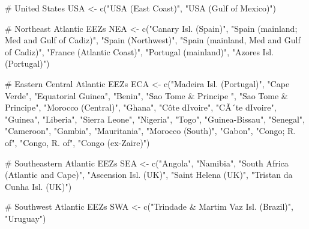 \documentclass[
  letterpaper,
  oneside,
  open=any]{scrbook}
\newenvironment{Shaded}{\begin{snugshade}}{\end{snugshade}}
\newcommand{\CommentTok}[1]{\textcolor[rgb]{0.37,0.37,0.37}{#1}}
\newcommand{\FunctionTok}[1]{\textcolor[rgb]{0.28,0.35,0.67}{#1}}
\newcommand{\NormalTok}[1]{\textcolor[rgb]{0.00,0.23,0.31}{#1}}
\newcommand{\OtherTok}[1]{\textcolor[rgb]{0.00,0.23,0.31}{#1}}
\newcommand{\StringTok}[1]{\textcolor[rgb]{0.13,0.47,0.30}{#1}}
\begin{document}
\begin{Shaded}
\begin{Highlighting}[]
\CommentTok{\# United States}
\NormalTok{USA }\OtherTok{\textless{}{-}}  \FunctionTok{c}\NormalTok{(}\StringTok{"USA (East Coast)"}\NormalTok{, }\StringTok{"USA (Gulf of Mexico)"}\NormalTok{)}
           
\CommentTok{\# Northeast Atlantic EEZs}
\NormalTok{NEA }\OtherTok{\textless{}{-}} \FunctionTok{c}\NormalTok{(}\StringTok{"Canary Isl. (Spain)"}\NormalTok{, }\StringTok{"Spain (mainland; Med and Gulf of Cadiz)"}\NormalTok{, }\StringTok{"Spain (Northwest)"}\NormalTok{, }
         \StringTok{"Spain (mainland, Med and Gulf of Cadiz)"}\NormalTok{, }
         \StringTok{"France (Atlantic Coast)"}\NormalTok{, }\StringTok{"Portugal (mainland)"}\NormalTok{, }\StringTok{"Azores Isl. (Portugal)"}\NormalTok{)}
        
\CommentTok{\# Eastern Central Atlantic EEZs}
\NormalTok{ECA }\OtherTok{\textless{}{-}} \FunctionTok{c}\NormalTok{(}\StringTok{"Madeira Isl. (Portugal)"}\NormalTok{, }\StringTok{"Cape Verde"}\NormalTok{, }\StringTok{"Equatorial Guinea"}\NormalTok{, }\StringTok{"Benin"}\NormalTok{, }
          \StringTok{"Sao Tome \& Principe "}\NormalTok{, }\StringTok{"Sao Tome \& Principe"}\NormalTok{, }\StringTok{"Morocco (Central)"}\NormalTok{, }\StringTok{"Ghana"}\NormalTok{, }
          \StringTok{"Côte d\textquotesingle{}Ivoire"}\NormalTok{, }\StringTok{"CÃ´te d\textquotesingle{}Ivoire"}\NormalTok{, }\StringTok{"Guinea"}\NormalTok{, }\StringTok{"Liberia"}\NormalTok{, }\StringTok{"Sierra Leone"}\NormalTok{, }\StringTok{"Nigeria"}\NormalTok{, }\StringTok{"Togo"}\NormalTok{, }
          \StringTok{"Guinea{-}Bissau"}\NormalTok{, }\StringTok{"Senegal"}\NormalTok{, }\StringTok{"Cameroon"}\NormalTok{, }\StringTok{"Gambia"}\NormalTok{, }\StringTok{"Mauritania"}\NormalTok{, }\StringTok{"Morocco (South)"}\NormalTok{, }
          \StringTok{"Gabon"}\NormalTok{, }\StringTok{"Congo; R. of"}\NormalTok{, }\StringTok{"Congo, R. of"}\NormalTok{, }\StringTok{"Congo (ex{-}Zaire)"}\NormalTok{)}

\CommentTok{\# Southeastern Atlantic EEZs}
\NormalTok{SEA }\OtherTok{\textless{}{-}} \FunctionTok{c}\NormalTok{(}\StringTok{"Angola"}\NormalTok{, }\StringTok{"Namibia"}\NormalTok{, }\StringTok{"South Africa (Atlantic and Cape)"}\NormalTok{,  }
           \StringTok{"Ascension Isl. (UK)"}\NormalTok{, }\StringTok{"Saint Helena (UK)"}\NormalTok{, }\StringTok{"Tristan da Cunha Isl. (UK)"}\NormalTok{)}

\CommentTok{\# Southwest Atlantic EEZs}
\NormalTok{SWA }\OtherTok{\textless{}{-}} \FunctionTok{c}\NormalTok{(}\StringTok{"Trindade \& Martim Vaz Isl. (Brazil)"}\NormalTok{, }\StringTok{"Uruguay"}\NormalTok{)}


\end{Highlighting}
\end{Shaded}
\end{document}
